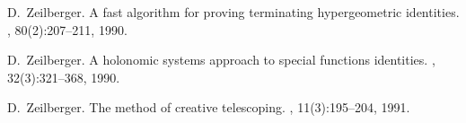 \documentclass{sig-alternate-05-2015}
\begin{document}
\begin{thebibliography}{10}
D.~Zeilberger.
\newblock A fast algorithm for proving terminating hypergeometric identities.
, 80(2):207--211, 1990.

D.~Zeilberger.
\newblock A holonomic systems approach to special functions identities.
,
  32(3):321--368, 1990.

D.~Zeilberger.
\newblock The method of creative telescoping.
, 11(3):195--204, 1991.

\end{thebibliography}
\end{document}
